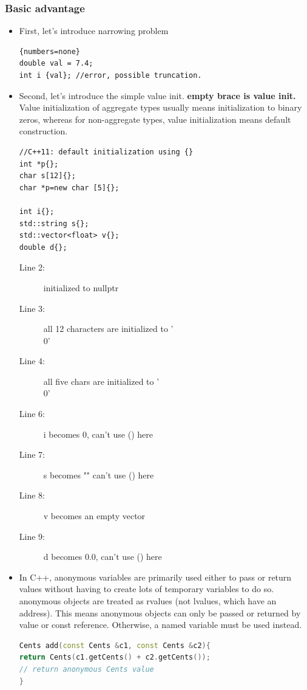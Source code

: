 \documentclass[a4paper,11pt,twoside]{book}
\begin{document}
\subsubsection{Basic advantage}
\begin{itemize}
\item First, let's introduce narrowing problem
\begin{lstlisting}{numbers=none}
double val = 7.4;
int i {val}; //error, possible truncation.
\end{lstlisting}


\item Second, let's introduce the simple value init. \textbf{empty brace is value init.} Value initialization of aggregate types usually means initialization to binary zeros, whereas for non-aggregate types, value initialization means default construction.
\begin{lstlisting}[numbers = none]
//C++11: default initialization using {}
int *p{}; 
char s[12]{}; 
char *p=new char [5]{}; 

int i{};                
std::string s{};        
std::vector<float> v{}; 
double d{};             
\end{lstlisting}
\begin{description}
	\item[Line 2:] initialized to nullptr
	\item[Line 3:] all 12 characters are initialized to '\\0'
	\item[Line 4:] all five chars are initialized to '\\0'
	\item[Line 6:] i becomes 0, can't use () here
	\item[Line 7:] s becomes "" can't use () here
	\item[Line 8:] v becomes an empty vector
	\item[Line 9:] d becomes 0.0, can't use () here
\end{description}



\item In C++, anonymous variables are primarily used either to pass or return values without having to create lots of temporary variables to do so. anonymous objects are treated as rvalues (not lvalues, which have an address). This means anonymous objects can only be passed or returned by value or const reference. Otherwise, a named variable must be used instead.

\begin{lstlisting}[frame=single, language=c++]
Cents add(const Cents &c1, const Cents &c2){
return Cents(c1.getCents() + c2.getCents());
// return anonymous Cents value
}


\end{lstlisting}
\end{itemize}
\end{document}

